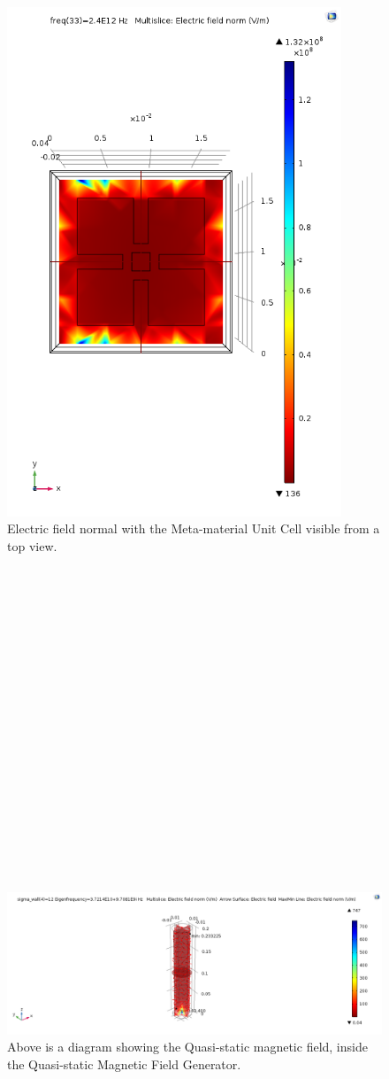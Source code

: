 \documentclass[]{article}
\begin{document}
\\
\begin{figure}[h!] 
	\centering
	\includegraphics[width=10cm, height=10 cm]{ElectricFieldNormalGraphImage.png}
	\caption{Electric field normal with the Meta-material Unit Cell visible from a top view.}
	\label{fig:mesh4}
\end{figure}
\\
\\
\\
\\
\\
\\
\\
\\
\\
\\
\\
\\
\\
\\
\\
\\
\\
\\
\begin{figure}[h!]
	\centering
	\includegraphics[width=\textwidth]{QuasistaticMagneticFieldVectorDirectionGraphImages.png}
	\caption{Above is a diagram showing the Quasi-static magnetic field, inside the Quasi-static Magnetic Field Generator.}
	\label{fig:mesh5}
\end{figure}
\end{document}

